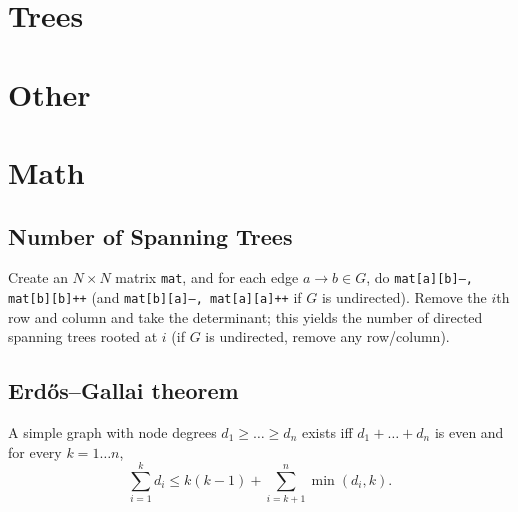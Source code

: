 \section{Trees}

\section{Other}


\section{Math}
	\subsection{Number of Spanning Trees}
		Create an $N\times N$ matrix \texttt{mat}, and for each edge $a \rightarrow b \in G$, do
		\texttt{mat[a][b]---, mat[b][b]++} (and \texttt{mat[b][a]---, mat[a][a]++} if $G$ is undirected).
		Remove the $i$th row and column and take the determinant; this yields the number of directed spanning trees rooted at $i$
		(if $G$ is undirected, remove any row/column).

	\subsection{Erdős–Gallai theorem}
		A simple graph with node degrees $d_1 \ge \dots \ge d_n$ exists iff $d_1 + \dots + d_n$ is even and for every $k = 1\dots n$,
		\[ \sum _{i=1}^{k}d_{i}\leq k(k-1)+\sum _{i=k+1}^{n}\min(d_{i},k). \]
